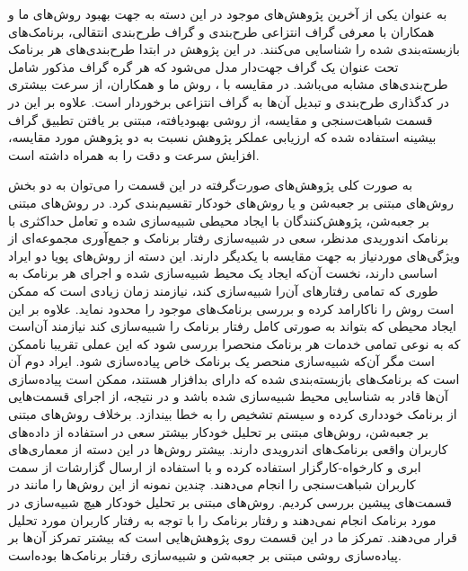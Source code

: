 به عنوان یکی از آخرین پژوهش‌های موجود در این دسته به جهت بهبود روش‌های  ما و همکاران  با معرفی گراف انتزاعی طرح‌بندی‌ و گراف طرح‌بندی انتقالی‌، برنامک‌های بازبسته‌بندی شده را شناسایی می‌کنند. در این پژوهش در ابتدا طرح‌بندی‌های هر برنامک تحت عنوان یک گراف جهت‌دار مدل می‌شود که هر گره‌ گراف مذکور شامل طرح‌بندی‌های مشابه می‌باشد. در مقایسه با ، روش ما و همکاران، از سرعت بیشتری در کدگذاری طرح‌بندی و تبدیل آن‌ها به گراف انتزاعی برخوردار است. علاوه بر این در قسمت شباهت‌سنجی و مقایسه، از روشی بهبود‌یافته، مبتنی بر یافتن تطبیق گراف بیشینه‌ استفاده شده که ارزیابی عملکر پژوهش نسبت به دو پژوهش مورد مقایسه، افزایش سرعت و دقت را به همراه داشته است.




به صورت کلی پژوهش‌های صورت‌گرفته  در این قسمت را می‌توان به دو بخش روش‌های مبتنی بر جعبه‌شن‌ و یا روش‌های خودکار تقسیم‌بندی کرد. در روش‌های مبتنی بر جعبه‌شن، پژوهش‌کنندگان با ایجاد محیطی شبیه‌سازی شده و تعامل حداکثری با برنامک اندوریدی مدنظر، سعی در شبیه‌سازی رفتار برنامک و جمع‌آوری مجموعه‌ای از ویژگی‌های موردنیاز به جهت مقایسه‌ با یکدیگر دارند. این دسته از روش‌های پویا دو ایراد اساسی دارند، نخست آن‌که ایجاد یک محیط شبیه‌سازی شده و اجرای هر برنامک به طوری که تمامی رفتار‌های آن‌‌را شبیه‌سازی کند، نیازمند زمان زیادی است که ممکن است روش را ناکارامد کرده و بررسی برنامک‌های موجود را محدود نماید. علاوه بر این ایجاد محیطی که بتواند به صورتی کامل رفتار برنامک را شبیه‌سازی کند نیازمند آن‌است که به نوعی تمامی خدمات هر برنامک منحصرا بررسی شود که این عملی تقریبا ناممکن است مگر آن‌که شبیه‌سازی منحصر یک برنامک خاص پیاده‌سازی شود. ایراد دوم آن‌ است که برنامک‌های بازبسته‌بندی شده که دارای بدافزار هستند، ممکن است پیاده‌سازی آن‌ها قادر به شناسایی محیط شبیه‌سازی شده باشد و در نتیجه، از اجرای قسمت‌هایی از برنامک خودداری کرده و سیستم تشخیص را به خطا بیندازد. برخلاف روش‌های مبتنی بر جعبه‌شن، روش‌های مبتنی بر تحلیل خودکار بیشتر سعی در استفاده از داده‌های کاربران واقعی برنامک‌های اندرویدی دارند. بیشتر روش‌ها در این دسته از معماری‌های ابری و کارخواه-کارگزار استفاده کرده و با استفاده از ارسال گزارشات‌ از سمت کاربران شباهت‌سنجی را انجام می‌دهند.
چندین نمونه از این روش‌ها را مانند  در قسمت‌های پیشین بررسی کردیم. روش‌های مبتنی بر تحلیل خود‌کار هیچ شبیه‌سازی در مورد برنامک انجام نمی‌دهند و رفتار برنامک را با توجه به رفتار کاربران مورد تحلیل قرار می‌دهند. تمرکز ما در این قسمت روی پژوهش‌هایی است که بیشتر تمرکز آن‌ها بر پیاده‌سازی روشی مبتنی بر جعبه‌شن و شبیه‌سازی رفتار برنامک‌ها بوده‌است.

